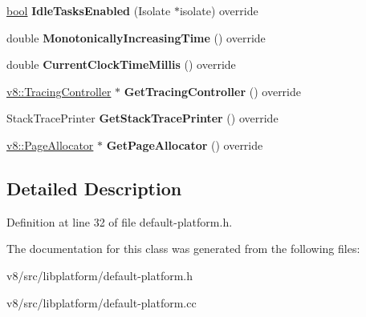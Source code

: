\begin{DoxyCompactItemize}
\item 
\mbox{\label{classv8_1_1platform_1_1DefaultPlatform_a002ce8f7666b3eece368b39c67d69f07}} 
\mbox{\hyperlink{classbool}{bool}} {\bfseries Idle\+Tasks\+Enabled} (Isolate $\ast$isolate) override
\item 
\mbox{\label{classv8_1_1platform_1_1DefaultPlatform_a18e7c05daaf277740e84db0e6712fc46}} 
double {\bfseries Monotonically\+Increasing\+Time} () override
\item 
\mbox{\label{classv8_1_1platform_1_1DefaultPlatform_ac4ebe4d87a83e71845b2a708d73ef195}} 
double {\bfseries Current\+Clock\+Time\+Millis} () override
\item 
\mbox{\label{classv8_1_1platform_1_1DefaultPlatform_a397fb3678955433ef1ba947c8d6f7b47}} 
\mbox{\hyperlink{classv8_1_1TracingController}{v8\+::\+Tracing\+Controller}} $\ast$ {\bfseries Get\+Tracing\+Controller} () override
\item 
\mbox{\label{classv8_1_1platform_1_1DefaultPlatform_aeea6aef7dc875ccb7113cc014c91517e}} 
Stack\+Trace\+Printer {\bfseries Get\+Stack\+Trace\+Printer} () override
\item 
\mbox{\label{classv8_1_1platform_1_1DefaultPlatform_a992060971393638e46e628c89858be6b}} 
\mbox{\hyperlink{classv8_1_1PageAllocator}{v8\+::\+Page\+Allocator}} $\ast$ {\bfseries Get\+Page\+Allocator} () override
\end{DoxyCompactItemize}


\subsection{Detailed Description}


Definition at line 32 of file default-\/platform.\+h.



The documentation for this class was generated from the following files\+:\begin{DoxyCompactItemize}
\item 
v8/src/libplatform/default-\/platform.\+h\item 
v8/src/libplatform/default-\/platform.\+cc\end{DoxyCompactItemize}
